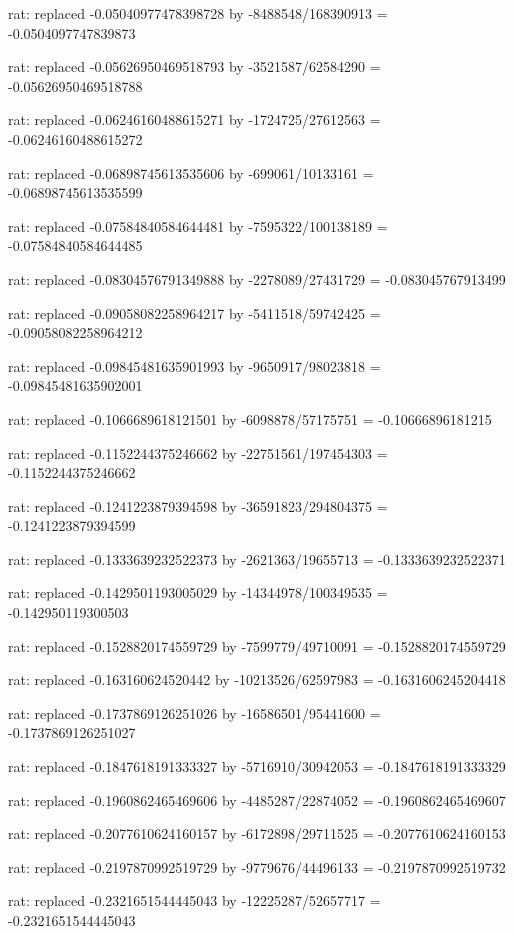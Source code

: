 \documentclass[a4paper,10pt]{article}
\begin{document}
\begin{eulernotebook}
\begin{eulercomment}
\begin{eulercomment}
\begin{eulercomment}
\begin{eulercomment}
\begin{eulercomment}
\begin{eulercomment}
\begin{eulercomment}
\begin{eulercomment}
\begin{eulercomment}
\begin{eulercomment}
\begin{eulercomment}
\begin{eulercomment}
\begin{eulercomment}
\begin{eulercomment}
\begin{eulercomment}
\begin{eulercomment}
\begin{euleroutput}
  rat: replaced -0.05040977478398728 by -8488548/168390913 = -0.0504097747839873
  
  rat: replaced -0.05626950469518793 by -3521587/62584290 = -0.05626950469518788
  
  rat: replaced -0.06246160488615271 by -1724725/27612563 = -0.06246160488615272
  
  rat: replaced -0.06898745613535606 by -699061/10133161 = -0.06898745613535599
  
  rat: replaced -0.07584840584644481 by -7595322/100138189 = -0.07584840584644485
  
  rat: replaced -0.08304576791349888 by -2278089/27431729 = -0.083045767913499
  
  rat: replaced -0.09058082258964217 by -5411518/59742425 = -0.09058082258964212
  
  rat: replaced -0.09845481635901993 by -9650917/98023818 = -0.09845481635902001
  
  rat: replaced -0.1066689618121501 by -6098878/57175751 = -0.10666896181215
  
  rat: replaced -0.1152244375246662 by -22751561/197454303 = -0.1152244375246662
  
  rat: replaced -0.1241223879394598 by -36591823/294804375 = -0.1241223879394599
  
  rat: replaced -0.1333639232522373 by -2621363/19655713 = -0.1333639232522371
  
  rat: replaced -0.1429501193005029 by -14344978/100349535 = -0.142950119300503
  
  rat: replaced -0.1528820174559729 by -7599779/49710091 = -0.1528820174559729
  
  rat: replaced -0.163160624520442 by -10213526/62597983 = -0.1631606245204418
  
  rat: replaced -0.1737869126251026 by -16586501/95441600 = -0.1737869126251027
  
  rat: replaced -0.1847618191333327 by -5716910/30942053 = -0.1847618191333329
  
  rat: replaced -0.1960862465469606 by -4485287/22874052 = -0.1960862465469607
  
  rat: replaced -0.2077610624160157 by -6172898/29711525 = -0.2077610624160153
  
  rat: replaced -0.2197870992519729 by -9779676/44496133 = -0.2197870992519732
  
  rat: replaced -0.2321651544445043 by -12225287/52657717 = -0.2321651544445043
  

\end{euleroutput}
\end{eulercomment}
\end{eulercomment}
\end{eulercomment}
\end{eulercomment}
\end{eulercomment}
\end{eulercomment}
\end{eulercomment}
\end{eulercomment}
\end{eulercomment}
\end{eulercomment}
\end{eulercomment}
\end{eulercomment}
\end{eulercomment}
\end{eulercomment}
\end{eulercomment}
\end{eulercomment}
\end{eulernotebook}
\end{document}
